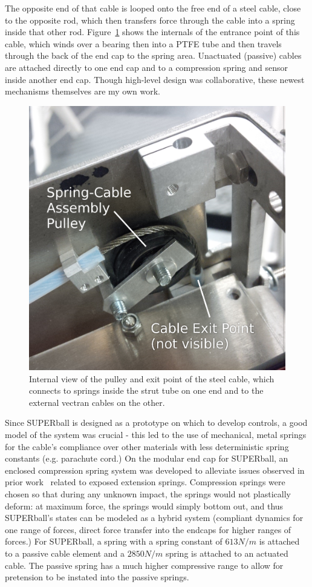 \documentclass[12pt]{report}
\begin{document}
The opposite end of that cable is looped onto the free end of a steel cable, close to the opposite rod, which then transfers force through the cable into a spring inside that other rod.
Figure~\ref{fig:cable_pulley_bearing_internals} shows the internals of the entrance point of this cable, which winds over a bearing then into a PTFE tube and then travels through the back of the end cap to the spring area.
Unactuated (passive) cables are attached directly to one end cap and to a compression spring and sensor inside another end cap.
Though high-level design was collaborative, these newest mechanisms themselves are my own work.

\begin{figure}[thpb]
      \centering
      \includegraphics[width=.5\columnwidth]{img/cable_pulley_bearing_labelled.jpg}
      \caption{Internal view of the pulley and exit point of the steel cable, which connects to springs inside the strut tube on one end and to the external vectran cables on the other.~\cite{sabelhaus2015system}}
      \label{fig:cable_pulley_bearing_internals}
      \vspace{-0.2cm}
\end{figure}



Since SUPERball is designed as a prototype on which to develop controls, a good model of the system was crucial - this led to the use of mechanical, metal springs for the cable's compliance over other materials with less deterministic spring constants (e.g. parachute cord.) 
On the modular end cap for SUPERball, an enclosed compression spring system was developed to alleviate issues observed in prior work~\cite{Caluwaerts2013rsif,bruce2014design} related to exposed extension springs.
Compression springs were chosen so that during any unknown impact, the springs would not plastically deform: at maximum force, the springs would simply bottom out, and thus SUPERball's states can be modeled as a hybrid system (compliant dynamics for one range of forces, direct force transfer into the endcaps for higher ranges of forces.) 
For SUPERball, a spring with a spring constant of $613 N/m$ is attached to a passive cable element and a $2850 N/m$ spring is attached to an actuated cable.
The passive spring has a much higher compressive range to allow for pretension to be instated into the passive springs. 
\end{document}
